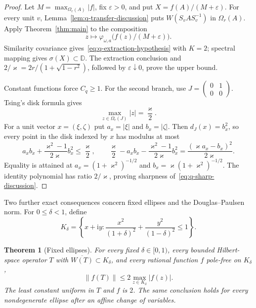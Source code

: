 \documentclass[preprints,article,submit,oneauthor]{Definitions/mdpi}
\newcounter{manuscriptresult}[section]
\theoremstyle{mdpi}
\newtheorem{theorem}[manuscriptresult]{Theorem}
\theoremstyle{definition}
\newcommand{\D}{\mathbb D}
\newcommand{\iu}{\mathrm{i}}
\begin{document}
\begin{proof}
Let $M=\max_{\Omega_r(A)}\lvert f\rvert$, fix $\varepsilon>0$, and
put $X=f(A)/(M+\varepsilon)$.  For every unit $v$,
Lemma~\ref{lem:q-transfer-discussion} puts
$W(S_vAS_v^{-1})$ in $\Omega_r(A)$.  Apply
Theorem~\ref{thm:main} to the composition
\[
  z\longmapsto
  \varphi_{\omega,a}\bigl(f(z)/(M+\varepsilon)\bigr).
\]
Similarity covariance gives~\eqref{eq:q-extraction-hypothesis} with
$K=2$; spectral mapping gives $\sigma(X)\subset\D$.  The extraction
conclusion and
$2/\varkappa=2r/(1+\sqrt{1-r^2})$, followed by
$\varepsilon\downarrow0$, prove the upper bound.

Constant functions force $C_q\geq1$.  For the second branch, use
$J=\left(\begin{smallmatrix}0&1\\0&0\end{smallmatrix}\right)$.
Tsing's disk formula gives
\[
  \max_{z\in\Omega_r(J)}\lvert z\rvert=\frac{\varkappa}{2}.
\]
For a unit vector $x=(\xi,\zeta)$ put
$a_x=\lvert\xi\rvert$ and $b_x=\lvert\zeta\rvert$.  Then
$d_J(x)=b_x^2$, so every point in the disk indexed by $x$ has modulus
at most
\[
 a_xb_x+\frac{\varkappa^2-1}{2\varkappa}b_x^2
 \leq\frac{\varkappa}{2},
 \qquad
 \frac{\varkappa}{2}-a_xb_x
 -\frac{\varkappa^2-1}{2\varkappa}b_x^2
 =\frac{(\varkappa a_x-b_x)^2}{2\varkappa}.
\]
Equality is attained at
$a_x=(1+\varkappa^2)^{-1/2}$ and
$b_x=\varkappa(1+\varkappa^2)^{-1/2}$.  The identity polynomial has
ratio $2/\varkappa$, proving sharpness of~\eqref{eq:q-sharp-discussion}.
\end{proof}

Two further exact consequences concern fixed ellipses and the
Douglas--Paulsen norm.  For $0\leq\delta<1$, define
\[
  K_\delta=\left\{x+\iu y:
  \frac{x^2}{(1+\delta)^2}
  +\frac{y^2}{(1-\delta)^2}\leq1\right\}.
\]

\begin{theorem}[Fixed ellipses]
\label{thm:ellipse-discussion}
For every fixed $\delta\in[0,1)$, every bounded Hilbert-space operator
$T$ with $\overline{W(T)}\subset K_\delta$, and every rational function
$f$ pole-free on $K_\delta$,
\[
  \lVert f(T)\rVert\leq2
  \max_{z\in K_\delta}\lvert f(z)\rvert.
\]
The least constant uniform in $T$ and $f$ is $2$.  The same conclusion
holds for every nondegenerate ellipse after an affine change of
variables.
\end{theorem}
\end{document}
